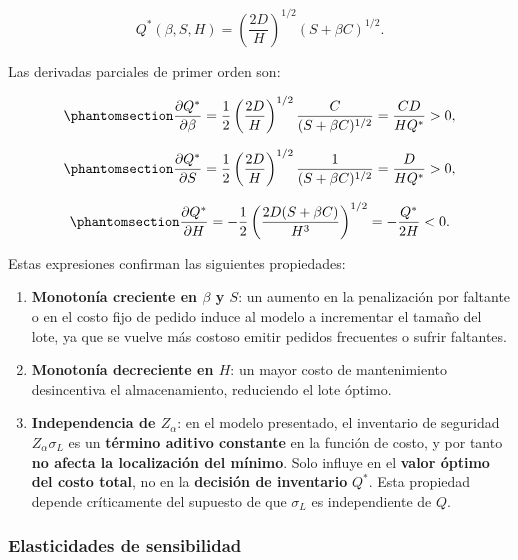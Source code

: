 \documentclass[
  spanish,
  us-letterpaper,
  DIV=11,
  numbers=noendperiod]{scrreprt}
\providecommand{\tightlist}{%
  \setlength{\itemsep}{0pt}\setlength{\parskip}{0pt}}
\numberwithin{equation}{section}
\begin{document}
\[
Q^*(\beta, S, H) = \left( \frac{2 D}{H} \right)^{1/2} (S + \beta C)^{1/2}.
\]

Las derivadas parciales de primer orden son:

\begin{equation}\phantomsection\label{eq-dQ_dBeta}{
\frac{\partial Q^*}{\partial \beta} = \frac{1}{2} \left( \frac{2 D}{H} \right)^{1/2} \frac{C}{(S + \beta C)^{1/2}} = \frac{C D}{H Q^*} > 0,
}\end{equation}

\begin{equation}\phantomsection\label{eq-dQ_dS}{
\frac{\partial Q^*}{\partial S} = \frac{1}{2} \left( \frac{2 D}{H} \right)^{1/2} \frac{1}{(S + \beta C)^{1/2}} = \frac{D}{H Q^*} > 0,
}\end{equation}

\begin{equation}\phantomsection\label{eq-dQ_dH}{
\frac{\partial Q^*}{\partial H} = -\frac{1}{2} \left( \frac{2 D (S + \beta C)}{H^3} \right)^{1/2} = -\frac{Q^*}{2 H} < 0.
}\end{equation}

Estas expresiones confirman las siguientes propiedades:

\begin{enumerate}
\def\labelenumi{\arabic{enumi}.}
\tightlist
\item
  \textbf{Monotonía creciente en \(\beta\) y \(S\)}: un aumento en la
  penalización por faltante o en el costo fijo de pedido induce al
  modelo a incrementar el tamaño del lote, ya que se vuelve más costoso
  emitir pedidos frecuentes o sufrir faltantes.
\item
  \textbf{Monotonía decreciente en \(H\)}: un mayor costo de
  mantenimiento desincentiva el almacenamiento, reduciendo el lote
  óptimo.
\item
  \textbf{Independencia de \(Z_\alpha\)}: en el modelo presentado, el
  inventario de seguridad \(Z_\alpha \sigma_L\) es un \textbf{término
  aditivo constante} en la función de costo, y por tanto \textbf{no
  afecta la localización del mínimo}. Solo influye en el \textbf{valor
  óptimo del costo total}, no en la \textbf{decisión de inventario}
  \(Q^*\). Esta propiedad depende críticamente del supuesto de que
  \(\sigma_L\) es independiente de \(Q\).
\end{enumerate}

\subsubsection{Elasticidades de
sensibilidad}\label{elasticidades-de-sensibilidad}
\end{document}
